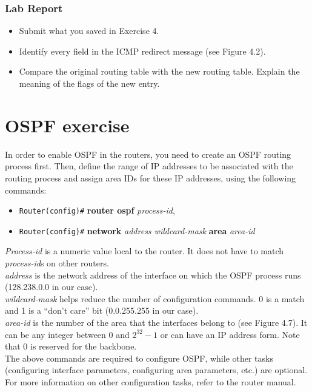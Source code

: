 \documentclass{../UTNetLab}
\begin{document}
    \subsubsection*{Lab Report}
    \begin{itemize}
        \setlength{\itemindent}{0pt}
        \item Submit what you saved in Exercise 4.
        \item Identify every field in the ICMP redirect message (see Figure 4.2).
        \item Compare the original routing table with the new routing table. Explain the meaning of the flags of the new entry.
    \end{itemize}


\section*{OSPF exercise}
    In order to enable OSPF in the routers, you need to create an OSPF routing process first.
    Then, define the range of IP addresses to be associated with the routing process and assign area IDs for these IP addresses, using the following commands:
    \begin{itemize}
        \item [] \texttt{Router(config)\#} \textbf{router ospf} \textit{process-id},
        \item [] \texttt{Router(config)\#} \textbf{network} \textit{address wildcard-mask} \textbf{area} \textit{area-id}
    \end{itemize}
    \textit{Process-id} is a numeric value local to the router.
    It does not have to match \textit{process-id}s on other routers.\\
    \textit{address} is the network address of the interface on which the OSPF process runs (128.238.0.0 in our case).\\
    \textit{wildcard-mask} helps reduce the number of configuration commands.
    0 is a match and 1 is a “don’t care” bit (0.0.255.255 in our case).\\
    \textit{area-id} is the number of the area that the interfaces belong to (see Figure 4.7).
    It can be any integer between 0 and $2^{32} - 1$ or can have an IP address form.
    Note that 0 is reserved for the backbone. \\
    The above commands are required to configure OSPF, while other tasks (configuring interface parameters, configuring area parameters, etc.) are optional.
    For more information on other configuration tasks, refer to the router manual. \\
\end{document}
